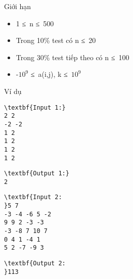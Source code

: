 Giới hạn
\begin{itemize}
	\item 1 ≤ n ≤ 500
	\item Trong 10\% test có n ≤ 20
	\item Trong 30\% test tiếp theo có n ≤ 100
	\item -$10^{9}$ ≤ a(i,j), k ≤ $10^{9}$
\end{itemize}
Ví dụ
\begin{itemize}
\end{itemize}
\begin{verbatim}
\textbf{Input 1:}
2 2
-2 -2
1 2
1 2
1 2
1 2 \end{verbatim}
\begin{verbatim}
\textbf{Output 1:}
2
\end{verbatim}
\begin{verbatim}
\textbf{Input 2:
}5 7
-3 -4 -6 5 -2
9 9 2 -3 -3
-3 -8 7 10 7
0 4 1 -4 1
5 2 -7 -9 3
\end{verbatim}
\begin{verbatim}
\textbf{Output 2:
}113\end{verbatim}